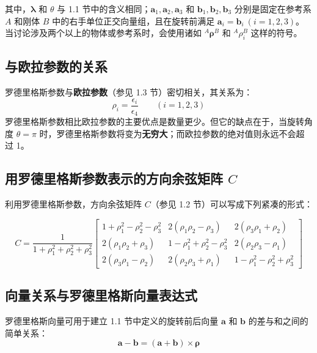 其中，\(\boldsymbol{\lambda}\) 和 \(\theta\) 与 1.1 节中的含义相同；\(\mathbf{a}_1, \mathbf{a}_2, \mathbf{a}_3\) 和 \(\mathbf{b}_1, \mathbf{b}_2, \mathbf{b}_3\) 分别是固定在参考系 \(A\) 和刚体 \(B\) 中的右手单位正交向量组，且在旋转前满足 \(\mathbf{a}_i = \mathbf{b}_i \ (i=1,2,3)\)。当讨论涉及两个以上的物体或参考系时，会使用诸如 \({}^A \boldsymbol{\rho}^B\) 和 \({}^A \rho_i^B\) 这样的符号。

\subsection*{与欧拉参数的关系}
罗德里格斯参数与\textbf{欧拉参数}（参见 1.3 节）密切相关，其关系为：
\begin{equation}
\rho_i = \frac{\epsilon_i}{\epsilon_4} \qquad (i = 1, 2, 3) \tag{3}
\end{equation}
罗德里格斯参数相比欧拉参数的主要优点是数量更少。但它的缺点在于，当旋转角度 \(\theta = \pi\) 时，罗德里格斯参数将变为\textbf{无穷大}；而欧拉参数的绝对值则永远不会超过 1。

\subsection*{用罗德里格斯参数表示的方向余弦矩阵 \(C\)}
利用罗德里格斯参数，方向余弦矩阵 \(C\)（参见 1.2 节）可以写成下列紧凑的形式：

\begin{equation}
C = \frac{1}{1 + \rho_1^2 + \rho_2^2 + \rho_3^2} 
\begin{bmatrix} 
1 + \rho_1^2 - \rho_2^2 - \rho_3^2 & 2(\rho_1\rho_2 - \rho_3) & 2(\rho_3\rho_1 + \rho_2) \\
2(\rho_1\rho_2 + \rho_3) & 1 - \rho_1^2 + \rho_2^2 - \rho_3^2 & 2(\rho_2\rho_3 - \rho_1) \\
2(\rho_3\rho_1 - \rho_2) & 2(\rho_2\rho_3 + \rho_1) & 1 - \rho_1^2 - \rho_2^2 + \rho_3^2
\end{bmatrix} \tag{4}
\end{equation}

\subsection*{向量关系与罗德里格斯向量表达式}
罗德里格斯向量可用于建立 1.1 节中定义的旋转前后向量 \(\mathbf{a}\) 和 \(\mathbf{b}\) 的差与和之间的简单关系：
\begin{equation}
\mathbf{a} - \mathbf{b} = (\mathbf{a} + \mathbf{b}) \times \boldsymbol{\rho} \tag{5}
\end{equation}


